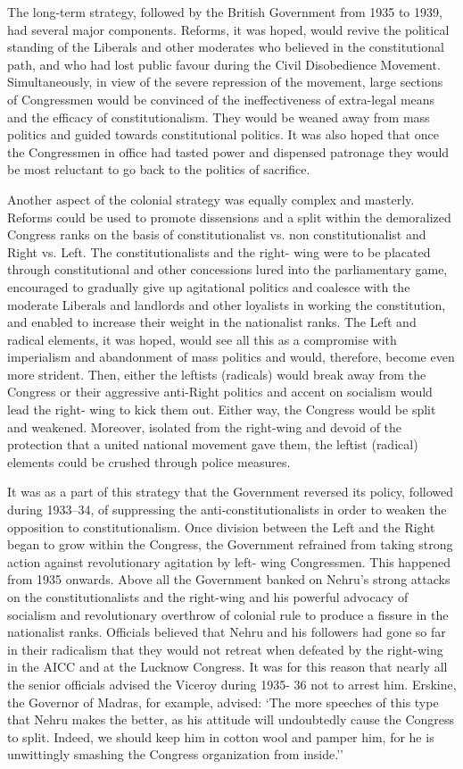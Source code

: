 The long-term strategy, followed by the British Government from 1935 to 1939, had several major components. Reforms, it was hoped, would revive the political standing of the Liberals and other moderates who believed in the constitutional path, and who had lost public favour during the Civil Disobedience Movement. Simultaneously, in view of the severe repression of the movement, large sections of Congressmen would be convinced of the ineffectiveness of extra-legal means and the efficacy of constitutionalism. They would be weaned away from mass politics and guided towards constitutional politics. It was also hoped that once the Congressmen in office had tasted power and dispensed patronage they would be most reluctant to go back to the politics of sacrifice. 

Another aspect of the colonial strategy was equally complex and masterly. Reforms could be used to promote dissensions and a split within the demoralized Congress ranks on the basis of constitutionalist vs. non constitutionalist and Right vs. Left. The constitutionalists and the right- wing were to be placated through constitutional and other concessions lured into the parliamentary game, encouraged to gradually give up agitational politics and coalesce with the moderate Liberals and landlords and other loyalists in working the constitution, and enabled to increase their weight in the nationalist ranks. The Left and radical elements, it was hoped, would see all this as a compromise with imperialism and abandonment of mass politics and would, therefore, become even more strident. Then, either the leftists (radicals) would break away from the Congress or their aggressive anti-Right politics and accent on socialism would lead the right- wing to kick them out. Either way, the Congress would be split and weakened. Moreover, isolated from the right-wing and devoid of the protection that a united national movement gave them, the leftist (radical) elements could be crushed through police measures. 

It was as a part of this strategy that the Government reversed its policy, followed during 1933--34, of suppressing the anti-constitutionalists in order to weaken the opposition to constitutionalism. Once division between the Left and the Right began to grow within the Congress, the Government refrained from taking strong action against revolutionary agitation by left- wing Congressmen. This happened from 1935 onwards. Above all the Government banked on Nehru's strong attacks on the constitutionalists and the right-wing and his powerful advocacy of socialism and revolutionary overthrow of colonial rule to produce a fissure in the nationalist ranks. Officials believed that Nehru and his followers had gone so far in their radicalism that they would not retreat when defeated by the right-wing in the AICC and at the Lucknow Congress. It was for this reason that nearly all the senior officials advised the Viceroy during 1935- 36 not to arrest him. Erskine, the Governor of Madras, for example, advised: `The more speeches of this type that Nehru makes the better, as his attitude will undoubtedly cause the Congress to split. Indeed, we should keep him in cotton wool and pamper him, for he is unwittingly smashing the Congress organization from inside.'' 

